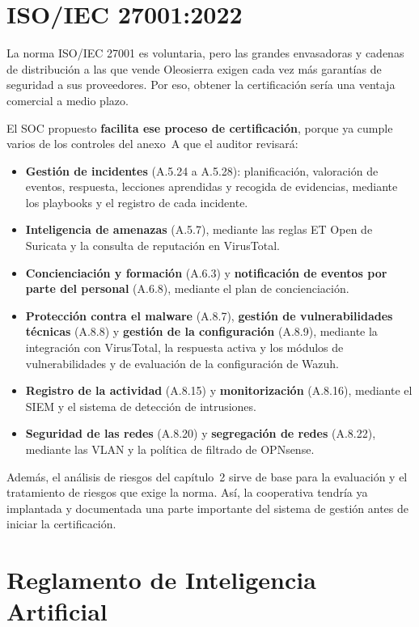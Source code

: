 \documentclass[11pt,a4paper,oneside]{report}
\begin{document}
\section{ISO/IEC 27001:2022}

La norma ISO/IEC 27001 es voluntaria, pero las grandes envasadoras y cadenas de distribución a las que vende Oleosierra exigen cada vez más garantías de seguridad a sus proveedores. Por eso, obtener la certificación sería una ventaja comercial a medio plazo.

El SOC propuesto \textbf{facilita ese proceso de certificación}, porque ya cumple varios de los controles del anexo~A que el auditor revisará:
\begin{itemize}
  \item \textbf{Gestión de incidentes} (A.5.24 a A.5.28): planificación, valoración de eventos, respuesta, lecciones aprendidas y recogida de evidencias, mediante los playbooks y el registro de cada incidente.
  \item \textbf{Inteligencia de amenazas} (A.5.7), mediante las reglas ET Open de Suricata y la consulta de reputación en VirusTotal.
  \item \textbf{Concienciación y formación} (A.6.3) y \textbf{notificación de eventos por parte del personal} (A.6.8), mediante el plan de concienciación.
  \item \textbf{Protección contra el malware} (A.8.7), \textbf{gestión de vulnerabilidades técnicas} (A.8.8) y \textbf{gestión de la configuración} (A.8.9), mediante la integración con VirusTotal, la respuesta activa y los módulos de vulnerabilidades y de evaluación de la configuración de Wazuh.
  \item \textbf{Registro de la actividad} (A.8.15) y \textbf{monitorización} (A.8.16), mediante el SIEM y el sistema de detección de intrusiones.
  \item \textbf{Seguridad de las redes} (A.8.20) y \textbf{segregación de redes} (A.8.22), mediante las VLAN y la política de filtrado de OPNsense.
\end{itemize}
Además, el análisis de riesgos del capítulo~2 sirve de base para la evaluación y el tratamiento de riesgos que exige la norma. Así, la cooperativa tendría ya implantada y documentada una parte importante del sistema de gestión antes de iniciar la certificación.

\section{Reglamento de Inteligencia Artificial}
\end{document}
